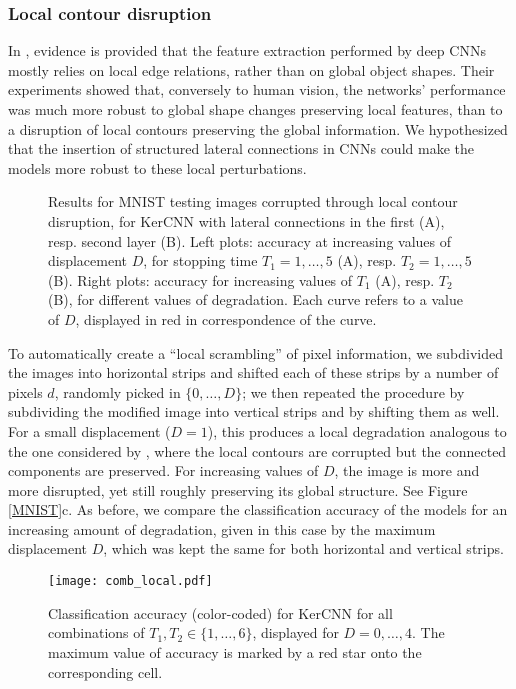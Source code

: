 \documentclass[11pt,oneside,reqno]{amsart}
\renewcommand{\baselinestretch}{1.5} \interfootnotelinepenalty=10000
\begin{document}
 
 \subsubsection{Local contour disruption} 
 In \citet{baker}, evidence is provided that the feature extraction performed by deep CNNs mostly relies on local edge relations, rather than on global object shapes. Their experiments showed that, conversely to human vision, the networks' performance was much more robust to global shape changes preserving local features, than to a disruption of local contours preserving the global information. We hypothesized that the insertion of structured lateral connections in CNNs could make the models more robust to these local perturbations.\\ 
 \begin{figure}[htbp!]
 \centering
 {\renewcommand{\baselinestretch}{0}
 \;
 }
 \caption{Results for MNIST testing images corrupted through local contour disruption, for KerCNN with lateral connections in the first (A), resp. second layer (B). Left plots: accuracy at increasing values of displacement $D$, for stopping time $T_1=1,\ldots,5$ (A), resp. $T_2=1,\ldots,5$ (B). Right plots: accuracy for increasing values of $T_1$ (A), resp. $T_2$ (B), for different values of degradation. Each curve refers to a value of $D$, displayed in red in correspondence of the curve.}\label{local}
 \end{figure}
 To automatically create a ``local scrambling'' of pixel information, we subdivided the images into horizontal strips and shifted each of these strips by a number of pixels $d$, randomly picked in $\{0,\ldots,D\}$; we then repeated the procedure by subdividing the modified image into vertical strips and by shifting them as well. For a small displacement ($D=1$), this produces a local degradation analogous to the one considered by \citet{baker}, where the local contours are corrupted but the connected components are preserved. For increasing values of $D$, the image is more and more disrupted, yet still roughly preserving its global structure. See Figure \ref{MNIST}c. As before, we compare the classification accuracy of the models for an increasing amount of degradation, given in this case by the maximum displacement $D$, which was kept the same for both horizontal and vertical strips. 
 \begin{figure}[htbp!]
  \centering
 \texttt{[image: comb\_local.pdf]}
 \caption{Classification accuracy (color-coded) for KerCNN for all combinations of $T_1, T_2 \in \{1,\ldots,6\}$, displayed for $D=0,\ldots,4$. The maximum value of accuracy is marked by a red star onto the corresponding cell.}\label{comb_local}
 \end{figure}
\end{document}
